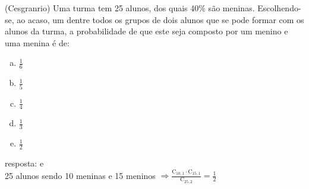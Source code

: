 \begin{ex}
 (Cesgranrio) Uma turma tem 25 alunos, dos quais 40\% são meninas. Escolhendo-se, ao acaso, um dentre todos os grupos de dois alunos que se pode formar com os alunos da turma, a probabilidade de que este seja composto por um menino e uma menina é de:
    \begin{enumerate}[(a)]
    \item $\frac{1}{6}$
    \item $\frac{1}{5}$
    \item $\frac{1}{4}$
    \item $\frac{1}{3}$
    \item $\frac{1}{2}$
    \end{enumerate}
      \begin{sol}
       resposta: e \\
       25 alunos sendo 10 meninas e 15 meninos 
       $\Longrightarrow\frac{\mathrm{C}_{{10},1}\cdot \mathrm{C}_{{15},1}}{\mathrm{C}_{{25},2}}=\frac{1}{2}$
      \end{sol}
\end{ex}